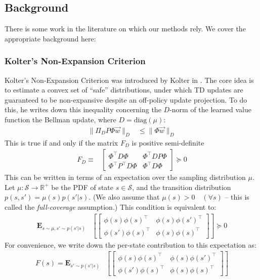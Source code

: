 \documentclass[11pt]{article}
\newcommand{\E}{\textbf{E}}
\begin{document}
\subsection{Background }

There is some work in the literature on which our methods rely. We cover the appropriate background here:

\subsubsection{Kolter's Non-Expansion Criterion }

Kolter's Non-Expansion Criterion was introduced by Kolter in \citeyear{kolter2011fixed}. The core idea is to estimate a convex set of ``safe'' distributions, under which TD updates are guaranteed to be non-expansive despite an off-policy update projection. To do this, he writes down this inequality concerning the $D$-norm of the learned value function the Bellman update, where $D=\text{diag}(\mu)$:
\begin{align}
    \|\Pi_D P\Phi \vec w\|_D & \leq \|\Phi \vec w\|_D
\end{align}
This is true if and only if the matrix $F_D$ is positive semi-definite
\begin{align}
    F_D \equiv & \begin{bmatrix}
        \Phi^\top D \Phi & \Phi^\top D P \Phi \\
        \Phi^\top P^\top D \Phi & \Phi^\top D \Phi
    \end{bmatrix} \succcurlyeq 0 \label{eqn:koltercondmat}
\end{align}
This can be written in terms of an expectation over the sampling distribution $\mu$. Let $\mu : \mathcal S \to \mathbb R^+$ be the PDF of state $s \in \mathcal S$, and the transition distribution $p(s,s') = \mu(s) p(s'|s)$. (We also assume that $\mu(s) > 0 \quad (\forall s)$ -- this is called the \emph{full-coverage} assumption.) This condition is equivalent to:
\begin{align}
  \E_{s\sim \mu, s'\sim p(s'|s)} & \left[\begin{bmatrix}
        \phi(s)\phi(s)^\top & \phi(s)\phi(s')^\top \\
        \phi(s')\phi(s)^\top & \phi(s)\phi(s)^\top
    \end{bmatrix}\right] \succcurlyeq 0 \label{eqn:koldercondstate}
\end{align}
For convenience, we write down the per-state contribution to this expectation as:
\begin{align}
F(s) = \E_{s'\sim p(s'|s)} & \left[\begin{bmatrix}
    \phi(s)\phi(s)^\top & \phi(s)\phi(s')^\top \\
    \phi(s')\phi(s)^\top & \phi(s)\phi(s)^\top
\end{bmatrix}\right]
\end{align}
\end{document}
